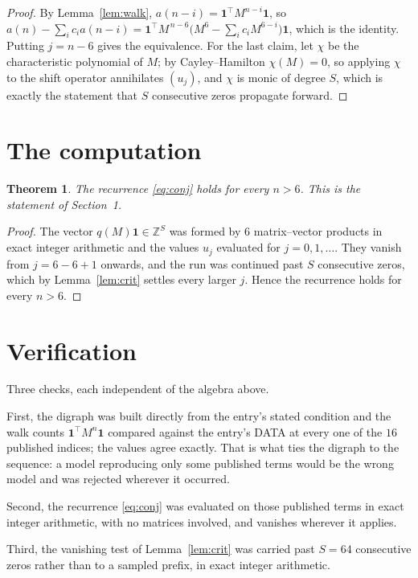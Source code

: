 \documentclass[11pt,a4paper]{article}
\theoremstyle{plain}
\newtheorem{theorem}{Theorem}
\theoremstyle{definition}
\begin{document}
\begin{proof}
By Lemma~\ref{lem:walk}, $a(n-i)=\mathbf{1}^{\!\top}M^{n-i}\mathbf{1}$, so
$a(n)-\sum_i c_i a(n-i)
=\mathbf{1}^{\!\top}M^{\,n-6}\bigl(M^{6}-\sum_i c_i M^{6-i}\bigr)
\mathbf{1}$, which is the identity. Putting $j=n-6$ gives the equivalence. For the
last claim, let $\chi$ be the characteristic polynomial of $M$; by Cayley--Hamilton
$\chi(M)=0$, so applying $\chi$ to the shift operator annihilates $(u_j)$, and $\chi$ is
monic of degree $S$, which is exactly the statement that $S$ consecutive zeros propagate
forward.
\end{proof}

\section{The computation}

\begin{theorem}
The recurrence \eqref{eq:conj} holds for every $n>6$. This is the statement of
Section~1.
\end{theorem}

\begin{proof}
The vector $q(M)\mathbf{1}\in\mathbb{Z}^{S}$ was formed by $6$ matrix--vector
products in exact integer arithmetic and the values $u_j$ evaluated for
$j=0,1,\dots$. They vanish from $j=6-6+1$ onwards, and the run was continued past
$S$ consecutive zeros, which by Lemma~\ref{lem:crit} settles every larger $j$. Hence the
recurrence holds for every $n>6$.
\end{proof}

\section{Verification}

Three checks, each independent of the algebra above.

First, the digraph was built directly from the entry's stated condition and the walk counts
$\mathbf{1}^{\!\top}M^{n}\mathbf{1}$ compared against the entry's DATA at every one of
the $16$ published indices; the values agree exactly. That is what ties the digraph to
the sequence: a model reproducing only some published terms would be the wrong model and
was rejected wherever it occurred.

Second, the recurrence \eqref{eq:conj} was evaluated on those published terms in exact
integer arithmetic, with no matrices involved, and vanishes wherever it applies.

Third, the vanishing test of Lemma~\ref{lem:crit} was carried past $S=64$ consecutive
zeros rather than to a sampled prefix, in exact integer arithmetic.
\end{document}
